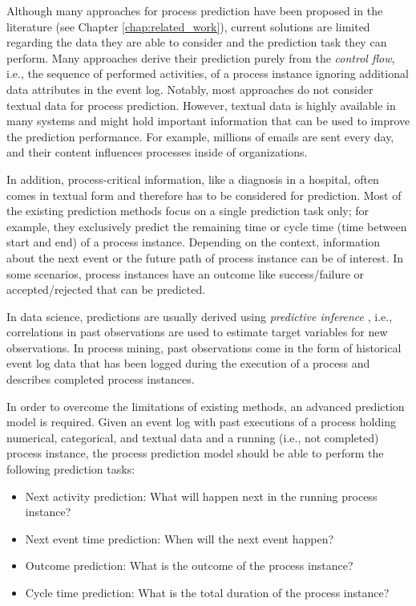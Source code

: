 Although many approaches for process prediction have been proposed in the literature (see Chapter \ref{chap:related_work}), current solutions are limited regarding the data they are able to consider and the prediction task they can perform.
Many approaches derive their prediction purely from the \textit{control flow}, i.e., the sequence of performed activities, of a process instance ignoring additional data attributes in the event log.
Notably, most approaches do not consider textual data for process prediction.
However, textual data is highly available in many systems and might hold important information that can be used to improve the prediction performance.
For example, millions of emails are sent every day, and their content influences processes inside of organizations.

In addition, process-critical information, like a diagnosis in a hospital, often comes in textual form and therefore has to be considered for prediction.
Most of the existing prediction methods focus on a single prediction task only; for example, they exclusively predict the remaining time or cycle time (time between start and end) of a process instance.
Depending on the context, information about the next event or the future path of process instance can be of interest.
In some scenarios, process instances have an outcome like success/failure or accepted/rejected that can be predicted.

In data science, predictions are usually derived using \textit{predictive inference} \cite{predinf}, i.e., correlations in past observations are used to estimate target variables for new observations.
In process mining, past observations come in the form of historical event log data that has been logged during the execution of a process and describes completed process instances.

In order to overcome the limitations of existing methods, an advanced prediction model is required.
Given an event log with past executions of a process holding numerical, categorical, and textual data and a running (i.e., not completed) process instance, the process prediction model should be able to perform the following prediction tasks:

\begin{itemize}
	\item Next activity prediction: What will happen next in the running process instance?
	\item Next event time prediction: When will the next event happen?
	\item Outcome prediction: What is the outcome of the process instance?
	\item Cycle time prediction: What is the total duration of the process instance?
\end{itemize}

